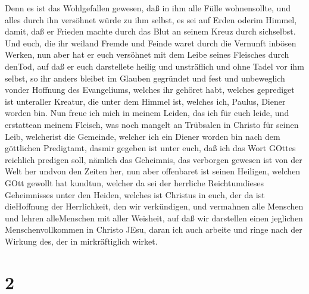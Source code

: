  Denn es ist das Wohlgefallen gewesen, daß in ihm alle
Fülle wohnensollte,  und alles durch ihn versöhnet würde zu
ihm selbst, es sei auf Erden oderim Himmel, damit, daß er Frieden machte
durch das Blut an seinem Kreuz durch sichselbst.  Und euch,
die ihr weiland Fremde und Feinde waret durch die Vernunft inbösen
Werken,  nun aber hat er euch versöhnet mit dem Leibe
seines Fleisches durch denTod, auf daß er euch darstellete heilig und
unsträflich und ohne Tadel vor ihm selbst,  so ihr anders
bleibet im Glauben gegründet und fest und unbeweglich vonder Hoffnung
des Evangeliums, welches ihr gehöret habt, welches geprediget ist
unteraller Kreatur, die unter dem Himmel ist, welches ich, Paulus,
Diener worden bin.  Nun freue ich mich in meinem Leiden,
das ich für euch leide, und erstattean meinem Fleisch, was noch mangelt
an Trübsalen in Christo für seinen Leib, welcherist die Gemeinde,
 welcher ich ein Diener worden bin nach dem göttlichen
Predigtamt, dasmir gegeben ist unter euch, daß ich das Wort GOttes
reichlich predigen soll,  nämlich das Geheimnis, das
verborgen gewesen ist von der Welt her undvon den Zeiten her, nun aber
offenbaret ist seinen Heiligen,  welchen GOtt gewollt hat
kundtun, welcher da sei der herrliche Reichtumdieses Geheimnisses unter
den Heiden, welches ist Christus in euch, der da ist dieHoffnung der
Herrlichkeit,  den wir verkündigen, und vermahnen alle
Menschen und lehren alleMenschen mit aller Weisheit, auf daß wir
darstellen einen jeglichen Menschenvollkommen in Christo JEsu,
 daran ich auch arbeite und ringe nach der Wirkung des, der
in mirkräftiglich wirket.

\hypertarget{section-1}{%
\section{2}\label{section-1}}

